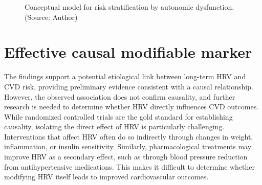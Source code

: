\documentclass[
  letterpaper,
  headsepline=true,
  open=any]{scrbook}
\begin{document}
\begin{figure}

\begin{minipage}[t]{\linewidth}

{\centering 


\caption{Conceptual model for risk stratification by autonomic
dysfunction. (Source: Author)}

}

\end{minipage}%

\end{figure}

\hypertarget{effective-causal-modifiable-marker}{%
\section{Effective causal modifiable
marker}\label{effective-causal-modifiable-marker}}

The findings support a potential etiological link between long-term HRV
and CVD risk, providing preliminary evidence consistent with a causal
relationship. However, the observed association does not confirm
causality, and further research is needed to determine whether HRV
directly influences CVD outcomes. While randomized controlled trials are
the gold standard for establishing causality, isolating the direct
effect of HRV is particularly challenging. Interventions that affect HRV
often do so indirectly through changes in weight, inflammation, or
insulin sensitivity. Similarly, pharmacological treatments may improve
HRV as a secondary effect, such as through blood pressure reduction from
antihypertensive medications. This makes it difficult to determine
whether modifying HRV itself leads to improved cardiovascular outcomes.
\end{document}
